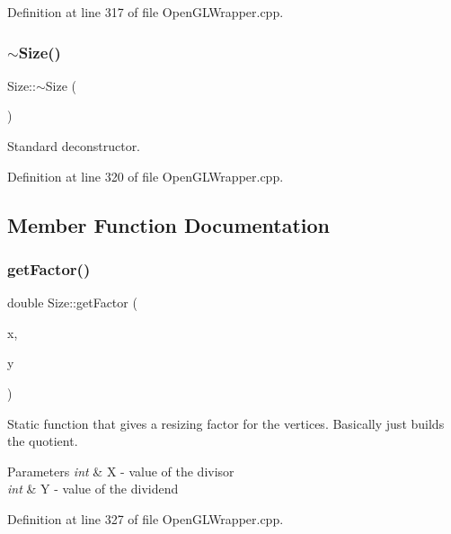 Definition at line 317 of file Open\+G\+L\+Wrapper.\+cpp.

\mbox{\label{classSize_a0d82fe638fc5a83beee67e2cc91d284e}} 
\subsubsection{\texorpdfstring{$\sim$Size()}{~Size()}}
{\footnotesize\ttfamily Size\+::$\sim$\+Size (\begin{DoxyParamCaption}{ }\end{DoxyParamCaption})\hspace{0.3cm}{\ttfamily [virtual]}}

Standard deconstructor. 

Definition at line 320 of file Open\+G\+L\+Wrapper.\+cpp.



\subsection{Member Function Documentation}
\mbox{\label{classSize_a1f0f20fa0d81274342165fce2355ab63}} 
\subsubsection{\texorpdfstring{getFactor()}{getFactor()}}
{\footnotesize\ttfamily double Size\+::get\+Factor (\begin{DoxyParamCaption}\item[{int}]{x,  }\item[{int}]{y }\end{DoxyParamCaption})\hspace{0.3cm}{\ttfamily [static]}}



Static function that gives a resizing factor for the vertices. Basically just builds the quotient. 


\begin{DoxyParams}{Parameters}
{\em int} & X -\/ value of the divisor \\
\hline
{\em int} & Y -\/ value of the dividend \\
\hline
\end{DoxyParams}


Definition at line 327 of file Open\+G\+L\+Wrapper.\+cpp.

